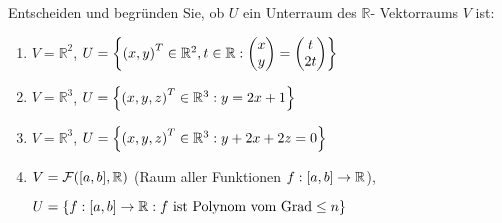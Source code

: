 \documentclass[german,12pt]{homework}
\newcommand{\RR}{\mathbb{R}}
\DeclarePairedDelimiter{\enbrace}{(}{)}
\DeclarePairedDelimiter{\benbrace}{[}{]}
\DeclarePairedDelimiter{\penbrace}{\{}{\}}
\begin{document}
    \begin{problem}
        Entscheiden und begründen Sie, ob \(U\) ein Unterraum des \(\RR\)-
        Vektorraums \(V\) ist:
        \begin{enumerate}
            \item \(V = \RR^2\), \(U = \penbrace*{\enbrace*{x, y}^T \in \RR^2,
            t \in \RR: \begin{pmatrix}x\\y\end{pmatrix} =
            \begin{pmatrix}t\\2t\end{pmatrix}}\)
            \item \(V = \RR^3\), \(U = \penbrace*{\enbrace*{x, y, z}^T \in
            \RR^3: y = 2x + 1}\)
            \item \(V = \RR^3\), \(U = \penbrace*{\enbrace*{x, y, z}^T \in
            \RR^3: y + 2x + 2z = 0}\)
            \item \(V = \mathcal{F}\enbrace*{\benbrace*{a, b}, \RR}\) (Raum
            aller Funktionen \(f: \benbrace*{a, b} \to \RR\)),

            \(U = \penbrace*{f: \benbrace*{a, b} \to \RR: f\text{ ist Polynom
            vom Grad}\le n}\)
        \end{enumerate}
    \end{problem}
\end{document}
